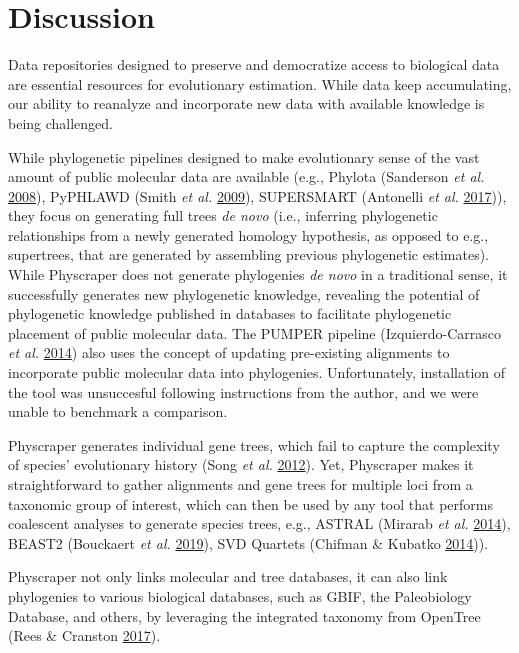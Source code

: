\documentclass[]{article}
\begin{document}
\hypertarget{discussion}{%
\section{Discussion}\label{discussion}}

Data repositories designed to preserve and democratize access to biological data
are essential resources for evolutionary estimation. While data keep accumulating,
our ability to reanalyze and incorporate new data with available knowledge is being challenged.

While phylogenetic pipelines designed to make evolutionary sense of the vast amount of public molecular data are available (e.g., Phylota (Sanderson \emph{et al.} \protect\hyperlink{ref-sanderson2008phylota}{2008}), PyPHLAWD (Smith \emph{et al.} \protect\hyperlink{ref-smith2009mega}{2009}), SUPERSMART (Antonelli \emph{et al.} \protect\hyperlink{ref-antonelli2017toward}{2017})), they focus on generating full trees \emph{de novo} (i.e., inferring phylogenetic relationships from a newly generated homology hypothesis, as opposed to e.g., supertrees, that are generated by assembling previous phylogenetic estimates).
While Physcraper does not generate phylogenies \emph{de novo} in a traditional sense,
it successfully generates new phylogenetic knowledge, revealing the potential of
phylogenetic knowledge published in databases to facilitate phylogenetic placement of public molecular data.
The PUMPER pipeline (Izquierdo-Carrasco \emph{et al.} \protect\hyperlink{ref-izquierdo2014pumper}{2014}) also uses the concept of updating
pre-existing alignments to incorporate public molecular data into phylogenies. Unfortunately, installation of the tool was unsuccesful following instructions from the author, and we were unable to benchmark a comparison.

Physcraper generates individual gene trees, which fail to capture the complexity of species' evolutionary history (Song \emph{et al.} \protect\hyperlink{ref-song2012resolving}{2012}). Yet, Physcraper makes it straightforward to gather alignments and gene trees for multiple loci from a taxonomic group of interest, which can then be used by any tool that performs coalescent analyses to generate species trees, e.g., ASTRAL (Mirarab \emph{et al.} \protect\hyperlink{ref-mirarab2014astral}{2014}), BEAST2 (Bouckaert \emph{et al.} \protect\hyperlink{ref-bouckaert2019beast}{2019}), SVD Quartets (Chifman \& Kubatko \protect\hyperlink{ref-chifman2014quartet}{2014})).

Physcraper not only links molecular and tree databases, it can also link phylogenies to various biological databases, such as GBIF, the Paleobiology Database, and others, by leveraging the integrated taxonomy from OpenTree (Rees \& Cranston \protect\hyperlink{ref-rees2017automated}{2017}).
\end{document}
